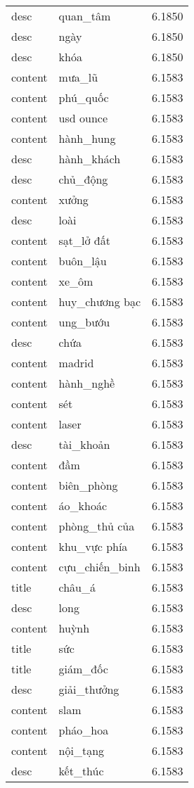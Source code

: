 \documentclass{article}
\begin{document}
\begin{tabular}{lll}
desc & quan\_tâm & 6.1850\\
desc & ngày & 6.1850\\
desc & khóa & 6.1850\\
content & mưa\_lũ & 6.1583\\
content & phú\_quốc & 6.1583\\
content & usd ounce & 6.1583\\
content & hành\_hung & 6.1583\\
desc & hành\_khách & 6.1583\\
desc & chủ\_động & 6.1583\\
content & xưởng & 6.1583\\
desc & loài & 6.1583\\
content & sạt\_lở đất & 6.1583\\
content & buôn\_lậu & 6.1583\\
content & xe\_ôm & 6.1583\\
content & huy\_chương bạc & 6.1583\\
content & ung\_bướu & 6.1583\\
desc & chứa & 6.1583\\
content & madrid & 6.1583\\
content & hành\_nghề & 6.1583\\
content & sét & 6.1583\\
content & laser & 6.1583\\
desc & tài\_khoản & 6.1583\\
content & đầm & 6.1583\\
content & biên\_phòng & 6.1583\\
content & áo\_khoác & 6.1583\\
content & phòng\_thủ của & 6.1583\\
content & khu\_vực phía & 6.1583\\
content & cựu\_chiến\_binh & 6.1583\\
title & châu\_á & 6.1583\\
desc & long & 6.1583\\
content & huỳnh & 6.1583\\
title & sức & 6.1583\\
title & giám\_đốc & 6.1583\\
desc & giải\_thưởng & 6.1583\\
content & slam & 6.1583\\
content & pháo\_hoa & 6.1583\\
content & nội\_tạng & 6.1583\\
desc & kết\_thúc & 6.1583\\

\end{tabular}
\end{document}
